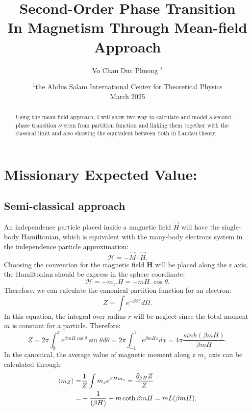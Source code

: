 \documentclass[a4paper]{article}
\title{Second-Order Phase Transition\\ In Magnetism Through Mean-field Approach}
\author{Vo Chau Duc Phuong $^1$}
\date{$^1$the Abdus Salam International Center for Theoretical Physics\vspace{4pt}\\March 2025}
\begin{document}
	\maketitle
	\begin{abstract}
Using the mean-field approach, I will show two way to calculate and model a second-phase transition system from partition function and linking them together with the classical limit and also showing the equivalent between both in Landau theory.
	\end{abstract}
\section{Missionary Expected Value:} %
	\subsection{Semi-classical approach}
\quad An independence particle placed inside a magnetic field \(\vec{H}\) will have the single-body Hamiltonian, which is equivalent with the many-body electrons system in the independence particle approximation:
	\begin{equation}
		\mathcal{H} = - \vec{M} \cdot \vec{H}.
	\end{equation}
\quad Choosing the convention for the magnetic field \(\textbf{H}\) will be placed along the z axis, the Hamiltonian should be express in the sphere coordinate:
	\begin{equation}
		\mathcal{H} = - m_z.H = -mH . \cos \theta.
	\end{equation}
\quad Therefore, we can calculate the canonical partition function for an electron:
	\begin{equation}
		Z = \int e^{-\beta \mathcal{H}} d\Omega.
	\end{equation}
\quad In this equation, the integral over radius \(r\) will be neglect since the total moment \(m\) is constant for a particle. Therefore:
	\begin{equation}
		Z = 2\pi \int_{0}^\pi e^{\beta m H \cos \theta } \sin \theta d\theta= 2\pi \int_{-1}^{1} e^{\beta m H x} dx = 4\pi \frac{sinh(\beta m H)}{\beta m H}.
	\end{equation}
\quad In the canonical, the average value of magnetic moment along z  \(m_z\) axis can be calculated through:
	\begin{align}
		\ev{m_Z} =& \frac{1}{Z} \int m_z e^{\beta H m_z} = \frac{\partial_{\beta H}Z}{Z}\\
		=& -\frac{1}{(\beta H)} + m\coth\beta m H = m L(\beta m H),
	\end{align}
\end{document}
